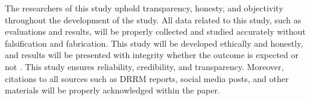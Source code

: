 \documentclass[12pt,a4paper]{report}
\begin{document}
\begin{description}[style=nextline,leftmargin=0pt]
  \item[Research Integrity.] The researchers of this study uphold transparency,
  honesty, and objectivity throughout the development of the study. All data
  related to this study, such as evaluations and results, will be properly
  collected and studied accurately without falsification and fabrication. This
  study will be developed ethically and honestly, and results will be presented
  with integrity whether the outcome is expected or not \parencite{belmont1979}.
  This study ensures reliability, credibility, and transparency. Moreover,
  citations to all sources such as DRRM reports, social media posts, and other
  materials will be properly acknowledged within the paper.
\end{description}


\printbibliography
\end{document}
